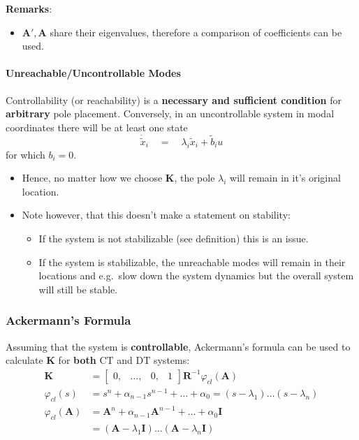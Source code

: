 \textbf{Remarks}:
\begin{itemize}
    \item $\mathbf{A'},\mathbf{A}$ share their eigenvalues, therefore a comparison of coefficients can be used.
\end{itemize}

\paragraph{Unreachable/Uncontrollable Modes}
Controllability (or reachability) is a \textbf{necessary and sufficient condition} for \textbf{arbitrary} pole placement.
Conversely, in an uncontrollable system in modal coordinates there will be at least one state
\begin{equation*}
    \dot{\tilde{x}}_i\quad=\quad\lambda_i\tilde{x}_i+\tilde{b}_i u
\end{equation*}
for which $b_i=0$.
\begin{itemize}
    \item Hence, no matter how we choose $\mathbf{K}$, the pole $\lambda_i$ will remain in it's original location.
    \item Note however, that this doesn't make a statement on stability:
          \begin{itemize}
              \item If the system is not stabilizable (see definition) this is an issue.
              \item If the system is stabilizable, the unreachable modes will remain in their locations and e.g.\ slow down the system dynamics but the overall system will still be stable.
          \end{itemize}
\end{itemize}

\subsubsection{Ackermann's Formula}
Assuming that the system is \textbf{controllable}, Ackermann's formula can be used to calculate $\mathbf{K}$ for \textbf{both} CT and DT systems:
\noindent\begin{align*}
    \mathbf{K}               & =\begin{bmatrix}
                                    0, & \ldots, & 0, & 1
                                \end{bmatrix}
    \mathbf{R}^{-1}\varphi_{cl}(\mathbf{A})                                                               \\
    \varphi_{cl}(s)          & =s^n+\alpha_{n-1}s^{n-1}+\ldots+\alpha_0=(s-\lambda_1)\ldots(s-\lambda_n)  \\
    \varphi_{cl}(\mathbf{A}) & =\mathbf{A}^n+\alpha_{n-1}\mathbf{A}^{n-1}+\ldots+\alpha_0 \mathbf{I}      \\
                             & = (\mathbf{A}-\lambda_1 \mathbf{I})\ldots(\mathbf{A}-\lambda_n \mathbf{I})
\end{align*}

